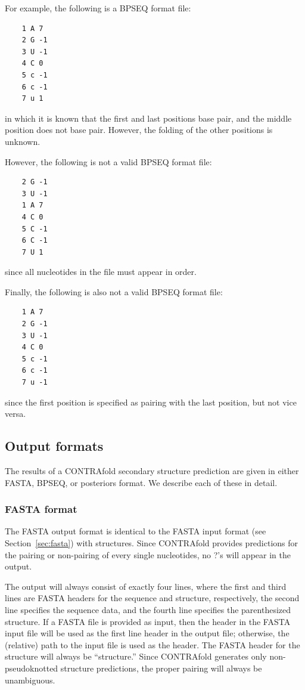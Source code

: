 \documentclass{article}
\begin{document}
  For example, the following is a BPSEQ format file:
  \begin{verbatim}
    1 A 7
    2 G -1
    3 U -1
    4 C 0
    5 c -1
    6 c -1
    7 u 1\end{verbatim}
  in which it is known that the first and last positions base pair,
  and the middle position does not base pair.  However, the folding of
  the other positions is unknown.

  However, the following is not a valid BPSEQ format file:
  \begin{verbatim}
    2 G -1
    3 U -1
    1 A 7
    4 C 0
    5 C -1
    6 C -1
    7 U 1\end{verbatim}
  since all nucleotides in the file must appear in order.

  Finally, the following is also not a valid BPSEQ format file:
  \begin{verbatim}
    1 A 7
    2 G -1
    3 U -1
    4 C 0
    5 c -1
    6 c -1
    7 u -1\end{verbatim}
  since the first position is specified as pairing with the last
  position, but not vice versa.

  \subsection{Output formats}

  The results of a CONTRAfold secondary structure prediction are given
  in either FASTA, BPSEQ, or posteriors format.  We describe each
  of these in detail.
  
  \subsubsection{FASTA format}

  The FASTA output format is identical to the FASTA input format (see
  Section~\ref{sec:fasta}) with structures.  Since CONTRAfold provides
  predictions for the pairing or non-pairing of every single
  nucleotides, no ?'s will appear in the output.

  The output will always consist of exactly four lines, where the
  first and third lines are FASTA headers for the sequence and
  structure, respectively, the second line specifies the sequence
  data, and the fourth line specifies the parenthesized structure.
  If a FASTA file is provided as input, then the header in the FASTA input
  file will be used as the first line header in the output file; otherwise,
  the (relative) path to the input file is used as the header.
  The FASTA header for the structure will always be ``structure.''
  Since CONTRAfold generates only non-pseudoknotted structure predictions,
  the proper pairing will always be unambiguous.
\end{document}
